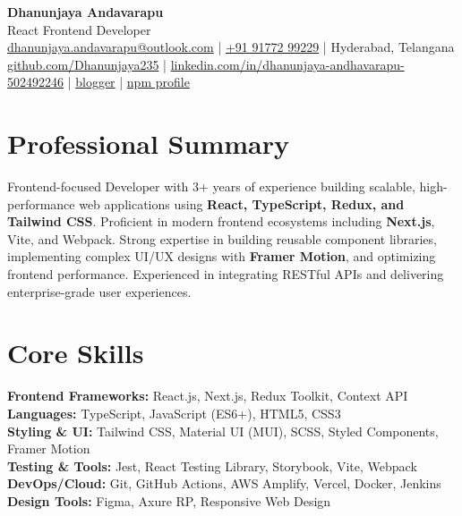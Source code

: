 \documentclass[11pt]{article}
\begin{document}
\begin{center}
    {\LARGE \textbf{Dhanunjaya Andavarapu}}\\
    \vspace{4pt}
    React Frontend Developer\\
    \vspace{4pt}
    \href{mailto:dhanunjaya.andavarapu@outlook.com}{dhanunjaya.andavarapu@outlook.com} \quad | \quad
    \href{tel:+919177299229}{+91 91772 99229} \quad | \quad
    Hyderabad, Telangana\\
    \vspace{4pt}
    \href{https://github.com/Dhanunjaya235}{github.com/Dhanunjaya235} \quad | \quad
    \href{https://www.linkedin.com/in/dhanunjaya-andhavarapu-502492246}{linkedin.com/in/dhanunjaya-andhavarapu-502492246} \quad | \quad
    \href{https://www.blogger.com/blog/pages/2357939272283650645}{blogger} \quad | \quad
    \href{https://www.npmjs.com/settings/dhanunjay/packages}{npm profile}
\end{center}

\section*{Professional Summary}
Frontend-focused Developer with 3+ years of experience building scalable, high-performance web applications using \textbf{React, TypeScript, Redux, and Tailwind CSS}. Proficient in modern frontend ecosystems including \textbf{Next.js}, Vite, and Webpack. Strong expertise in building reusable component libraries, implementing complex UI/UX designs with \textbf{Framer Motion}, and optimizing frontend performance. Experienced in integrating RESTful APIs and delivering enterprise-grade user experiences.

\section*{Core Skills}
\textbf{Frontend Frameworks:} React.js, Next.js, Redux Toolkit, Context API \\
\textbf{Languages:} TypeScript, JavaScript (ES6+), HTML5, CSS3 \\
\textbf{Styling & UI:} Tailwind CSS, Material UI (MUI), SCSS, Styled Components, Framer Motion \\
\textbf{Testing & Tools:} Jest, React Testing Library, Storybook, Vite, Webpack \\
\textbf{DevOps/Cloud:} Git, GitHub Actions, AWS Amplify, Vercel, Docker, Jenkins \\
\textbf{Design Tools:} Figma, Axure RP, Responsive Web Design
\end{document}
